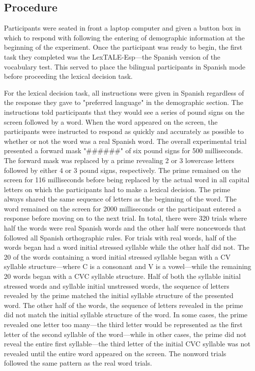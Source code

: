 
\subsection{Procedure}

Participants were seated in front a laptop computer and given a button box in which to respond with following the entering of demographic information at the beginning of the experiment. Once the participant was ready to begin, the first task they completed was the LexTALE-Esp---the Spanish version of the vocabulary test. This served to place the bilingual participants in Spanish mode before proceeding the lexical decision task.

For the lexical decision task, all instructions were given in Spanish regardless of the response they gave to "preferred language" in the demographic section. The instructions told participants that they would see a series of pound signs on the screen followed by a word. When the word appeared on the screen, the participants were instructed to respond as quickly and accurately as possible to whether or not the word was a real Spanish word. The overall experimental trial presented a forward mask "\#\#\#\#\#\#" of six pound signs for 500 milliseconds. The forward mask was replaced by a prime revealing 2 or 3 lowercase letters followed by either 4 or 3 pound signs, respectively. The prime remained on the screen for 116 milliseconds before being replaced by the actual word in all capital letters on which the participants had to make a lexical decision. The prime always shared the same sequence of letters as the beginning of the word. The word remained on the screen for 2000 milliseconds or the participant entered a response before moving on to the next trial. In total, there were 320 trials where half the words were real Spanish words and the other half were noncewords that followed all Spanish orthographic rules. For trials with real words, half of the words began had a word initial stressed syllable while the other half did not. The 20 of the words containing a word initial stressed syllable began with a CV syllable structure---where C is a consonant and V is a vowel---while the remaining 20 words began with a CVC syllable structure. Half of both the syllable initial stressed words and syllable initial unstressed words, the sequence of letters revealed by the prime matched the initial syllable structure of the presented word. The other half of the words, the sequence of letters revealed in the prime did not match the initial syllable structure of the word. In some cases, the prime revealed one letter too many---the third letter would be represented as the first letter of the second syllable of the word---while in other cases, the prime did not reveal the entire first syllable---the third letter of the initial CVC syllable was not revealed until the entire word appeared on the screen. The nonword trials followed the same pattern as the real word trials.

